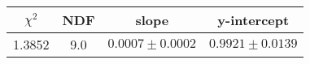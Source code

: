 \begin{tabular}{|c|c|c|c|}

\hline
$\chi^{2}$ & NDF & slope & y-intercept  \\
\hline
1.3852 & 9.0 & $0.0007\pm0.0002$ & $0.9921\pm0.0139$ \\
\hline

\end{tabular}